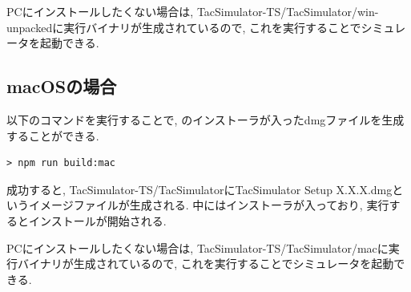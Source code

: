 PCにインストールしたくない場合は, TacSimulator-TS/TacSimulator/win-unpackedに実行バイナリが生成されているので, これを実行することでシミュレータを起動できる.

\subsection{macOSの場合}

以下のコマンドを実行することで, \tacsim のインストーラが入ったdmgファイルを生成することができる.

\begin{mylist}
\begin{verbatim}
> npm run build:mac
\end{verbatim}
\end{mylist}

成功すると, TacSimulator-TS/TacSimulatorにTacSimulator Setup X.X.X.dmgというイメージファイルが生成される. 中にはインストーラが入っており, 実行するとインストールが開始される.

PCにインストールしたくない場合は, TacSimulator-TS/TacSimulator/macに実行バイナリが生成されているので, これを実行することでシミュレータを起動できる.
